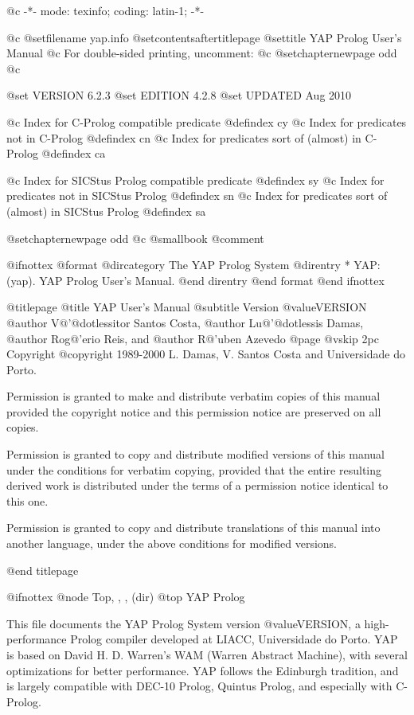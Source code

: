  @c -*- mode: texinfo; coding: latin-1; -*-

@c %
@setfilename yap.info
@setcontentsaftertitlepage
@settitle YAP Prolog User's Manual
@c For double-sided printing, uncomment:
@c @setchapternewpage odd
@c %

@set VERSION 6.2.3
@set EDITION 4.2.8
@set UPDATED Aug 2010

@c Index for C-Prolog compatible predicate
@defindex cy
@c Index for predicates not in C-Prolog
@defindex cn
@c Index for predicates sort of (almost) in C-Prolog
@defindex ca

@c Index for SICStus Prolog compatible predicate
@defindex sy
@c Index for predicates not in SICStus Prolog
@defindex sn
@c Index for predicates sort of (almost) in SICStus Prolog
@defindex sa


@setchapternewpage odd
@c @smallbook
@comment %

@ifnottex
@format
@dircategory The YAP Prolog System
@direntry
* YAP: (yap).           YAP Prolog User's Manual.
@end direntry
@end format
@end ifnottex

@titlepage
@title YAP User's Manual
@subtitle Version @value{VERSION}
@author V@'{@dotless{i}}tor Santos Costa,
@author Lu@'{@dotless{i}}s Damas,
@author Rog@'erio Reis, and
@author R@'uben Azevedo
@page
@vskip 2pc
Copyright @copyright{} 1989-2000 L. Damas, V. Santos Costa and Universidade
do Porto.

Permission is granted to make and distribute verbatim copies of
this manual provided the copyright notice and this permission notice
are preserved on all copies.

Permission is granted to copy and distribute modified versions of this
manual under the conditions for verbatim copying, provided that the entire
resulting derived work is distributed under the terms of a permission
notice identical to this one.

Permission is granted to copy and distribute translations of this manual
into another language, under the above conditions for modified versions.

@end titlepage

@ifnottex
@node Top, , , (dir)
@top YAP Prolog

This file documents the YAP Prolog System version @value{VERSION}, a
high-performance Prolog compiler developed at LIACC, Universidade do
Porto. YAP is based on David H. D. Warren's WAM (Warren Abstract
Machine), with several optimizations for better performance. YAP follows
the Edinburgh tradition, and is largely compatible with DEC-10 Prolog,
Quintus Prolog, and especially with C-Prolog.

